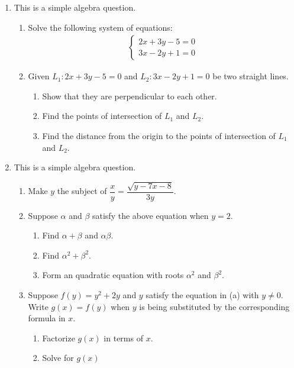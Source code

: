\documentclass[11pt]{article}
\begin{document}
    \begin{enumerate}
        \item This is a simple algebra question.\begin{enumerate}
            \item Solve the following system of equations:\begin{align*}
                \begin{cases}
                    2x+3y-5=0\\3x-2y+1=0
                \end{cases}
            \end{align*}
            \item Given $L_1:2x+3y-5=0$ and $L_2:3x-2y+1=0$ be two straight lines.\begin{enumerate}
                \item Show that they are perpendicular to each other.
                \item Find the points of intersection of $L_1$ and $L_2$. 
                \item Find the distance from the origin to the points of intersection of $L_1$ and $L_2$.
            \end{enumerate}
        \end{enumerate}
        \item This is a simple algebra question.\begin{enumerate}
            \item Make $y$ the subject of $\dfrac{x}{y}=\dfrac{\sqrt{y-7x-8}}{3y}$.
            \item Suppose $\alpha$ and $\beta$ satisfy the above equation when $y=2$.\begin{enumerate}
                \item Find $\alpha+\beta$ and $\alpha\beta$.
                \item Find $\alpha^2+\beta^2$.
                \item Form an quadratic equation with roots $\alpha^2$ and $\beta^2$.
            \end{enumerate}
            \item Suppose $f(y)=y^2+2y$ and $y$ satisfy the equation in (a) with $y\neq 0$. Write $g(x)=f(y)$ when $y$ is being substituted by the corresponding formula in $x$.\begin{enumerate}
                \item Factorize $g(x)$ in terms of $x$.
                \item Solve for $g(x)$

\end{enumerate}
\end{enumerate}
\end{enumerate}
\end{document}
